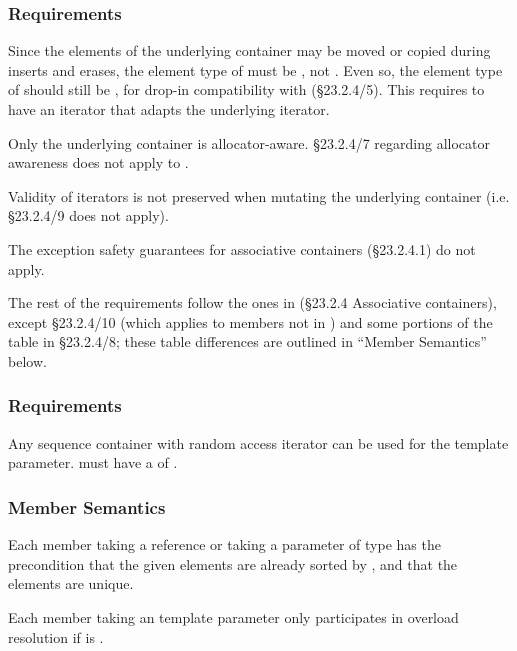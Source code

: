 \subsubsection{ Requirements}

Since the elements of the underlying container may be moved or copied during
inserts and erases, the element type of  must be
, not .  Even so, the element type
of  should still be , for drop-in
compatibility with  (\S23.2.4/5).  This requires  to
have an iterator that adapts the underlying  iterator.

Only the underlying container is allocator-aware.  \S23.2.4/7 regarding
allocator awareness does not apply to .

Validity of iterators is not preserved when mutating the underlying container
(i.e. \S23.2.4/9 does not apply).

The exception safety guarantees for associative containers (\S23.2.4.1) do not
apply.

The rest of the requirements follow the ones in (\S23.2.4 Associative
containers), except \S23.2.4/10 (which applies to members not in
) and some portions of the table in \S23.2.4/8; these table
differences are outlined in ``Member Semantics'' below.

\subsubsection{ Requirements}

Any sequence container with random access iterator can be used for the
 template parameter.   must have a
 of .

\subsubsection{Member Semantics}

Each member taking a  reference or taking a parameter of type
 has the precondition that the given
elements are already sorted by , and that the elements are
unique.

Each member taking an  template parameter only participates in
overload resolution if  is
.

